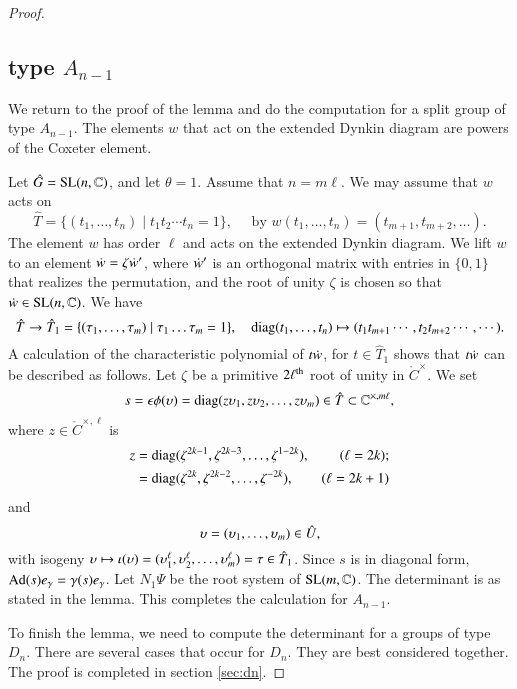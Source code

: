 \begin{proof}
\subsection{type $A_{n-1}$}
We return to the proof of the lemma and do the computation for a split
group of type $A_{n-1}$.  The elements $w$ that act on the extended
Dynkin diagram are powers of the Coxeter element.

Let $\hat G = {\operatorname{SL}}(n,\mathbb{C})$, and let $\theta=1$.  Assume that
$n=m \ell$.  We may assume that $w$ acts on
\[
\hat T = \{(t_1,\ldots,t_{n})\mid t_1t_2\cdots t_{n}=1\},\quad \text{ by } w(t_1,\ldots,t_{n}) = (t_{m+1},t_{m+2},\ldots).
\]
The element $w$ has order $\ell$ and acts on the extended Dynkin
diagram.  We lift $w$ to an element $\dot w = \zeta \dot w'$, where
$\dot w'$ is an orthogonal matrix with entries in $\{0,1\}$ that
realizes the permutation, and the root of unity $\zeta$ is chosen so
that $\dot w \in {\operatorname{SL}}(n,\mathbb{C})$.  We have
\[
\hat T \to \hat T_1 = \{(\tau_1,\ldots,\tau_m)\mid \tau_1\ldots\tau_m=1\},\quad {\operatorname{diag}}(t_1,\ldots,t_n)\mapsto (t_1t_{m+1}\cdots,t_2 t_{m+2}\cdots,\cdots).
\]
A calculation of the characteristic polynomial of $t\dot w$, for $t\in
\hat T_1$ shows that $t\dot w$ can be described as follows.  Let
$\zeta$ be a primitive $2\ell^{\operatorname{th}}$ root of unity in
$\ring{C}^\times$.  We set
\begin{equation}
s=\epsilon\phi(\upsilon)={\operatorname{diag}}(z\upsilon_1,z\upsilon_2,\ldots,z\upsilon_m)\in \hat T\subset \mathbb{C}^{\times,m\ell},
\end{equation}
where $z\in \ring{C}^{\times,\ell}$ is
\begin{align*}
z &= {\operatorname{diag}}(\zeta^{2k-1},\zeta^{2k-3},\ldots,\zeta^{1-2k}), &(\ell=2k);\\
      &= {\operatorname{diag}}(\zeta^{2k},\zeta^{2k-2},\ldots,\zeta^{-2k}), &(\ell=2k+1)
\end{align*}
and
\[
\upsilon=(\upsilon_1,\ldots,\upsilon_m)\in \hat U,
\]
with isogeny $\upsilon\mapsto
\iota(\upsilon)=(\upsilon_1^\ell,\upsilon_2^\ell,\ldots,\upsilon_m^\ell) = \tau\in \hat
T_1$.  Since $s$ is in diagonal form, ${\operatorname{Ad}}(s) e_\gamma = \gamma(s)
e_\gamma$.  Let $N_1\Psi$ be the root system of ${\operatorname{SL}}(m,\mathbb{C})$.
The determinant is as stated in the lemma.  This completes the
calculation for $A_{n-1}$.

To finish the lemma, we need to compute the determinant for a groups
of type $D_n$.  There are several cases that occur for $D_n$.  They
are best considered together.  The proof is completed in section
\ref{sec:dn}.
\end{proof}



